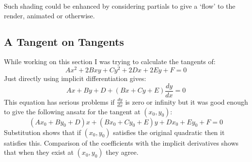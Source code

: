 Such shading could be enhanced by considering partials to give a `flow' to the render,
animated or otherwise.

\subsection{A Tangent on Tangents}
While working on this section I was trying to calculate the tangents of:
\[Ax^2+2Bxy+Cy^2+2Dx+2Ey+F=0\]
Just directly using implicit differentiation gives:
\[Ax+By+D+(Bx+Cy+E)\frac{dy}{dx}=0\]
This equation has serious problems if $\frac{dy}{dx}$ is zero or infinity but it was good enough to give the following ansatz for the tangent at $(x_0,y_0)$:
\[(Ax_0+By_0+D)x+(Bx_0+Cy_0+E)y+Dx_0+Ey_0+F=0\]
Substitution shows that if $(x_0,y_0)$ satisfies the original quadratic then it satisfies this.
Comparison of the coefficients with the implicit derivatives shows that when they exist at $(x_0,y_0)$ they agree.

